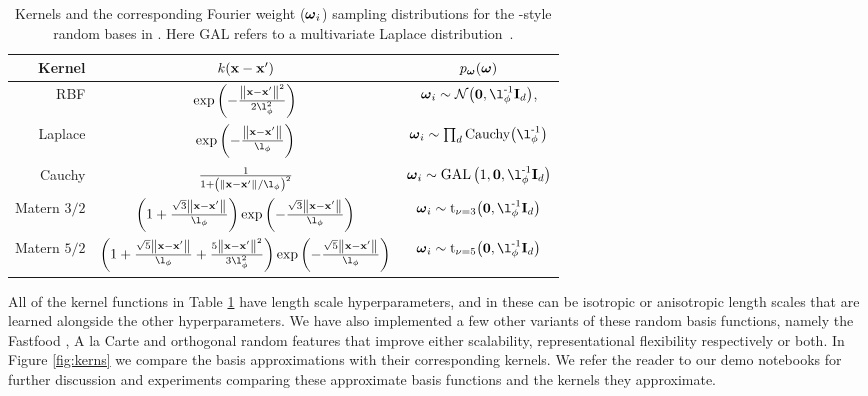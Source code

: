 \documentclass[11pt, oneside]{article}
\begin{document}
\begin{table}[htb]

    \centering

    \caption{Kernels and the corresponding Fourier weight ($\boldsymbol{\omega}_i$)
        sampling distributions for the \citet{rahimi2007}-style random bases in
        \revrand{}. Here GAL refers to a multivariate Laplace
        distribution~\cite{kozubowski2013multivariate}.}

    \begin{tabular}{r|c c}
        \textbf{Kernel} & $k\!\left({\mathbf{x} - \mathbf{x}'}\right)$
        & $p_{\boldsymbol{\omega}}(\boldsymbol{\omega})$ \\
        \hline
        RBF &
        $\exp\brac{-\frac{\lnorm{}{\inss - \inssprime}^2}{2\lenscale^2}}$ &
            $\ffourier_i \sim \gaus{\mathbf{0}, \lenscale\inv\ident{d}}$, \\
        Laplace & $\exp\brac{-\frac{\lnorm{}{\inss-\inssprime}}{\lenscale}}$ &
            $\ffourier_i \sim \prod_d \text{Cauchy}\!\brac{\lenscale\inv}$ \\
        Cauchy &
            $\frac{1}{1+\brac{\lnorm{}{\inss-\inssprime}/\lenscale}^2}$ & 
            $\ffourier_i \sim \text{GAL}\brac{1, \mathbf{0},
                \lenscale\inv\ident{d}}$ \\
        Matern $3/2$ & 
            $\brac{1 + \frac{\sqrt{3}\lnorm{}{\inss-\inssprime}}{\lenscale}}
            \exp\brac{-\frac{\sqrt{3}\lnorm{}{\inss-\inssprime}}{\lenscale}}$ & 
            $\ffourier_i \sim 
            \text{t}_{\nu=3}\!\brac{\mathbf{0}, \lenscale\inv\ident{d}}$ \\
        Matern $5/2$ &
            $\brac{1 + \frac{\sqrt{5}\lnorm{}{\inss-\inssprime}}{\lenscale} + 
                \frac{5\lnorm{}{\inss - \inssprime}^2}{3\lenscale^2}}
            \exp\brac{-\frac{\sqrt{5}\lnorm{}{\inss-\inssprime}}{\lenscale}}$ & 
            $\ffourier_i \sim 
            \text{t}_{\nu=5}\!\brac{\mathbf{0}, \lenscale\inv\ident{d}}$ \\
        \hline
    \end{tabular}

    \label{tab:randommappings}

\end{table}

All of the kernel functions in Table \ref{tab:randommappings} have length scale
hyperparameters, and in \revrand{} these can be isotropic or anisotropic length
scales that are learned alongside the other hyperparameters. We have also
implemented a few other variants of these random basis functions, namely the
Fastfood \citep{le2013fastfood}, A la Carte \citep{yang2014} and orthogonal
random features \citep{Yu2016orthogonal} that improve either scalability,
representational flexibility respectively or both. In Figure \ref{fig:kerns} we
compare the basis approximations with their corresponding kernels. We refer the
reader to our demo notebooks for further discussion and experiments comparing
these approximate basis functions and the kernels they approximate.
\end{document}
